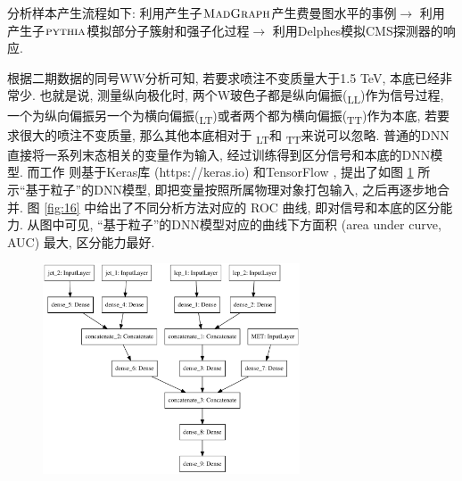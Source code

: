 \documentclass{SCIS2020cn}
\newcommand{\MADGRAPH}{\textsc{MadGraph}\xspace}
\newcommand{\PYTHIA}{{\textsc{pythia}}\xspace}
\newcommand{\Wboson}{\text{W}}
\begin{document}
分析样本产生流程如下: 利用产生子$\MADGRAPH$产生费曼图水平的事例$\rightarrow$ 利用产生子$\PYTHIA$模拟部分子簇射和强子化过程$\rightarrow$ 利用Delphes模拟CMS探测器的响应. 

根据二期数据的同号WW分析可知, 若要求喷注不变质量大于1.5
TeV, 本底已经非常少. 也就是说, 测量纵向极化时, 两个W玻色子都是纵向偏振(\Wboson\textsubscript{L}\Wboson\textsubscript{L})作为信号过程, 一个为纵向偏振另一个为横向偏振(\Wboson\textsubscript{L}\Wboson\textsubscript{T})或者两个都为横向偏振(\Wboson\textsubscript{T}\Wboson\textsubscript{T})作为本底, 若要求很大的喷注不变质量, 那么其他本底相对于 \Wboson\textsubscript{L}\Wboson\textsubscript{T}和 \Wboson\textsubscript{T}\Wboson\textsubscript{T}来说可以忽略. 普通的DNN直接将一系列末态相关的变量作为输入, 经过训练得到区分信号和本底的DNN模型. 而工作 \cite{49} 则基于Keras库 (https://keras.io) 和TensorFlow , 提出了如图 \ref{fig:15} 所示``基于粒子''的DNN模型, 即把变量按照所属物理对象打包输入, 之后再逐步地合并. 图 \ref{fig:16} 中给出了不同分析方法对应的 ROC 曲线, 即对信号和本底的区分能力. 从图中可见, ``基于粒子''的DNN模型对应的曲线下方面积 (area under curve, AUC) 最大, 区分能力最好. 

\begin{figure}[ht!]
\centering
\includegraphics[width=3in]{Figure-15.pdf}
\label{fig:15}
\end{figure}
\end{document}
